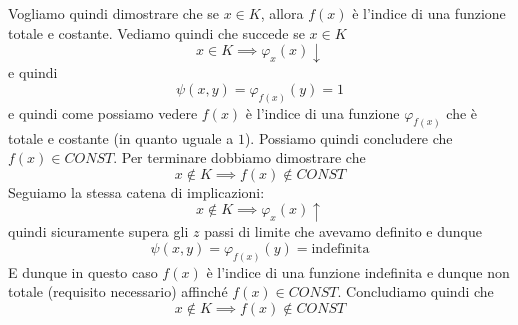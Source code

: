 Vogliamo quindi dimostrare che se $x \in K$, allora $f(x)$ è
l'indice di una funzione totale e costante. Vediamo quindi che
succede se $x \in K$
\[ x \in K \implies \varphi_x (x) \downarrow \]
e quindi
\[ \psi (x, y) = \varphi_{f(x)} (y) = 1 \]
e quindi come possiamo vedere $f(x)$ è l'indice di una funzione
$\varphi_{f(x)}$ che è totale e costante (in quanto uguale a
$1$). Possiamo quindi concludere che $f(x) \in CONST$. Per
terminare dobbiamo dimostrare che
\[ x \notin K \implies f(x) \notin CONST \]
Seguiamo la stessa catena di implicazioni:
\[ x \notin K \implies \varphi_x (x) \uparrow \]
quindi sicuramente supera gli $z$ passi di limite che avevamo
definito e dunque
\[ \psi (x, y) = \varphi_{f(x)} (y) = \text{indefinita} \]
E dunque in questo caso $f(x)$ è l'indice di una funzione
indefinita e dunque non totale (requisito necessario) affinché
$f(x) \in CONST$. Concludiamo quindi che
\[ x \notin K \implies f(x) \notin CONST \]
